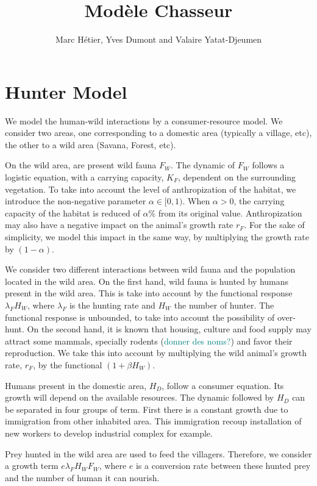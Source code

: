 \documentclass{article}
\title{Modèle Chasseur}
\author{Marc Hétier, Yves Dumont  and Valaire Yatat-Djeumen}
\newcommand{\lfw}{\lambda_{F}}
\newcommand{\lfw}{\lambda_{F}}
\newcommand{\marc}[1]{\textcolor{teal}{#1}}
\begin{document}
\maketitle


\section{Hunter Model}

We model the human-wild interactions by a consumer-resource model. We consider two areas, one corresponding to a domestic area (typically a village, etc), the other to a wild area (Savana, Forest, etc).


On the wild area, are present wild fauna $F_W$. The dynamic of $F_W$ follows a logistic equation, with a carrying capacity, $K_F$, dependent on the surrounding vegetation. To take into account the level of anthropization of the habitat, we introduce the non-negative parameter $\alpha \in [0, 1)$. When $\alpha > 0$, the carrying capacity of the habitat is reduced of $\alpha \%$ from its original value. Anthropization may also have a negative impact on the animal's growth rate $r_F$. For the sake of simplicity, we model this impact in the same way, by multiplying the growth rate by $(1-\alpha)$.

We consider two different interactions between wild fauna and the population located in the wild area. On the first hand, wild fauna is hunted by humans present in the wild area. This is take into account by the functional response $\lfw H_W$, where $\lfw$ is the hunting rate and $H_W$ the number of hunter. The functional response is unbounded, to take into account the possibility of over-hunt. On the second hand, it is known that housing, culture and food supply may attract some mammals, specially rodents (\marc{donner des noms?}) and favor their reproduction. We take this into account by multiplying the wild animal's growth rate, $r_F$, by the functional $(1 +  \beta H_W)$.

Humans present in the domestic area, $H_D$, follow a consumer equation. Its growth will depend on the available resources. The dynamic followed by $H_D$ can be separated in four groups of term. 
First there is a constant growth due to immigration from other inhabited area. This immigration recoup installation of new workers to develop industrial complex for example.

Prey hunted in the wild area are used to feed the villagers. Therefore, we consider a growth term $e \lfw H_W F_W$, where $e$ is a conversion rate between these hunted prey and the number of human it can nourish.
\end{document}
